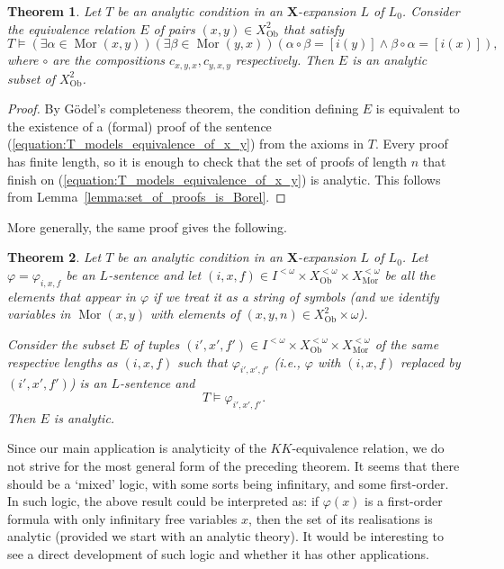 \documentclass[12pt]{amsart}
\newtheorem{theorem}{Theorem}[section]
\DeclareMathOperator{\Mor}{Mor}
\DeclareMathOperator{\Ob}{Ob}
\begin{document}
\begin{theorem}\label{thm:T_equivalence_is_analytic}
    Let $T$ be an analytic condition in an $\mathbf{X}$-expansion $L$ of $L_0$. Consider the equivalence relation $E$ of pairs $(x,y) \in X_{\Ob}^2$ that satisfy
    \begin{equation}\label{equation:T_models_equivalence_of_x_y}
        T \models (\exists \alpha \in \Mor(x,y))(\exists \beta \in \Mor(y,x))( \alpha \circ \beta = [i(y)] \wedge \beta \circ \alpha = [i(x)] ),
    \end{equation}
    where $\circ$ are the compositions $c_{x,y,x}, c_{y,x,y}$ respectively. Then $E$ is an analytic subset of $X_{\Ob}^2$.
\end{theorem}
\begin{proof}
    By Gödel's completeness theorem, the condition defining $E$ is equivalent to the existence of a (formal) proof of the sentence (\ref{equation:T_models_equivalence_of_x_y}) from the axioms in $T$. Every proof has finite length, so it is enough to check that the set of proofs of length $n$ that finish on (\ref{equation:T_models_equivalence_of_x_y}) is analytic. This follows from Lemma~\ref{lemma:set_of_proofs_is_Borel}.
\end{proof}

More generally, the same proof gives the following.

\begin{theorem} \label{theorem: abstract analytic condition makes analytic relation}
    Let $T$ be an analytic condition in an $\mathbf{X}$-expansion $L$ of $L_0$. Let $\varphi = \varphi_{i, x, f}$ be an $L$-sentence and let $(i,x,f) \in I^{<\omega} \times X_{\Ob}^{<\omega} \times X_{\Mor}^{<\omega}$ be all the elements that appear in $\varphi$ if we treat it as a string of symbols (and we identify variables in $\Mor(x,y)$ with elements of $(x,y,n) \in X_{\Ob}^2 \times \omega$). 
    
    Consider the subset $E$ of tuples $(i',x',f') \in I^{<\omega} \times X_{\Ob}^{<\omega} \times X_{\Mor}^{<\omega}$ of the same respective lengths as $(i,x,f)$ such that $\varphi_{i', x', f'}$ (i.e., $\varphi$ with $(i,x,f)$ replaced by $(i',x',f')$) is an $L$-sentence and
    \begin{equation*}\label{equation:T_models_equivalence_of_x_y_new}
        T \models \varphi_{i', x', f'}.
    \end{equation*}
    Then $E$ is analytic.
\end{theorem}

Since our main application is analyticity of the $KK$-equivalence relation, we do not strive for the most general form of the preceding theorem. It seems that there should be a `mixed' logic, with some sorts being infinitary, and some first-order. In such logic, the above result could be interpreted as: if $\varphi(x)$ is a first-order formula with only infinitary free variables $x$, then the set of its realisations is analytic (provided we start with an analytic theory). It would be interesting to see a direct development of such logic and whether it has other applications.
\end{document}
